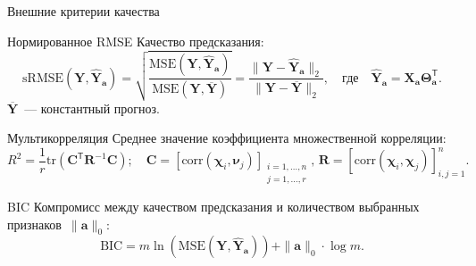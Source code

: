 \documentclass[9pt]{beamer}
\newcommand{\ba}{\mathbf{a}}
\newcommand{\bY}{\mathbf{Y}}
\newcommand{\bX}{\mathbf{X}}
\newcommand{\bC}{\mathbf{C}}
\newcommand{\bchi}{\boldsymbol{\chi}}
\newcommand{\bnu}{\boldsymbol{\nu}}
\newcommand{\bTheta}{\boldsymbol{\Theta}}
\newcommand{\T}{\mathsf{T}}
\begin{document}
\begin{frame}{Внешние критерии качества}

\begin{block}{Нормированное RMSE}
	Качество предсказания:
	\[
	\text{sRMSE}(\bY, \widehat{\bY}_{\ba}) = \sqrt{\frac{\text{MSE} (\bY, \widehat{\bY}_{\ba})}{\text{MSE} (\bY, \overline{\bY})}} =  \frac{\| \bY - \widehat{\bY}_{\ba} \|_2}{\| \bY - \overline{\bY} \|_2}, \quad \text{где} \quad \widehat{\bY}_{\ba} = \bX_{\ba} \bTheta_{\ba}^{\T}.
	\]
	$\overline{\bY}$~--- константный прогноз.
\end{block}

\begin{block}{Мультикорреляция}
	Среднее значение коэффициента множественной корреляции:
	\[
	R^2 = \frac{1}{r} \text{tr} \left( \bC^{\T} \mathbf{R}^{-1} \bC \right); \quad \bC = [ \text{corr}(\bchi_i, \bnu_j)]_{\substack{i=1, \dots, n \\ j=1, \dots, r}}, \, \mathbf{R} = [ \text{corr}(\bchi_i, \bchi_j)]_{i, j = 1}^n.
	\]
\end{block}
\begin{block}{BIC}
	Компромисс между качеством предсказания и количеством выбранных признаков~$\|\ba\|_0$:
	\[
	\text{BIC} = m \ln \left( \text{MSE} ( \bY, \widehat{\bY}_{\ba})\right) + \| \ba \|_0 \cdot \log m.
	\]
\end{block}
\end{frame}
\end{document}

